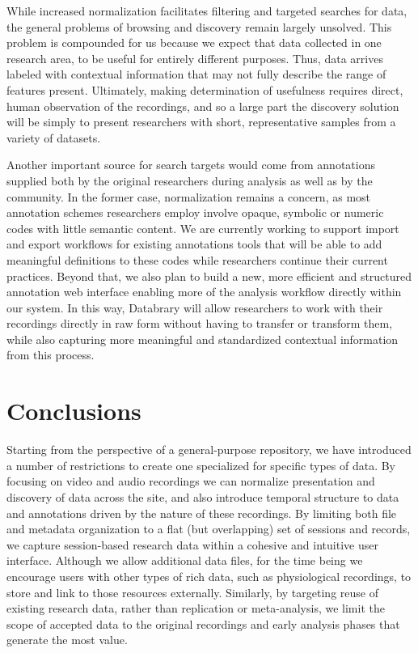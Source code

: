 \documentclass{sig-alternate}
\begin{document}
While increased normalization facilitates filtering and targeted searches for data, the general problems of browsing and discovery remain largely unsolved.
This problem is compounded for us because we expect that data collected in one research area, to be useful for entirely different purposes.
Thus, data arrives labeled with contextual information that may not fully describe the range of features present.
Ultimately, making determination of usefulness requires direct, human observation of the recordings, and so a large part the discovery solution will be simply to present researchers with short, representative samples from a variety of datasets.

Another important source for search targets would come from annotations supplied both by the original researchers during analysis as well as by the community.
In the former case, normalization remains a concern, as most annotation schemes researchers employ involve opaque, symbolic or numeric codes with little semantic content.
We are currently working to support import and export workflows for existing annotations tools that will be able to add meaningful definitions to these codes while researchers continue their current practices.
Beyond that, we also plan to build a new, more efficient and structured annotation web interface enabling more of the analysis workflow directly within our system.
In this way, Databrary will allow researchers to work with their recordings directly in raw form without having to transfer or transform them, while also capturing more meaningful and standardized contextual information from this process.

\section{Conclusions}

Starting from the perspective of a general-purpose repository, we have introduced a number of  restrictions to create one specialized for specific types of data.
By focusing on video and audio recordings we can normalize presentation and discovery of data across the site, and also introduce temporal structure to data and annotations driven by the nature of these recordings.
By limiting both file and metadata organization to a flat (but overlapping) set of sessions and records, we capture session-based research data within a cohesive and intuitive user interface.
Although we allow additional data files, for the time being we encourage users with other types of rich data, such as physiological recordings, to store and link to those resources externally.
Similarly, by targeting reuse of existing research data, rather than replication or meta-analysis, we limit the scope of accepted data to the original recordings and early analysis phases that generate the most value.
\end{document}
